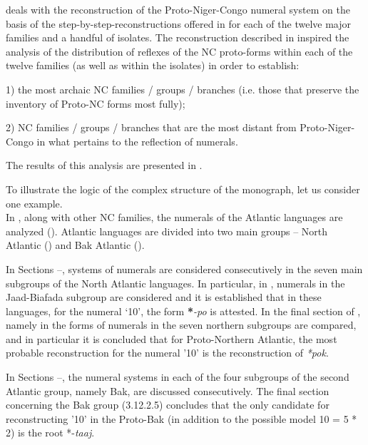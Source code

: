  deals with the reconstruction of the Proto-Niger-Congo numeral system on the basis of the step-by-step-reconstructions offered in  for each of the twelve major families and a handful of isolates.  
The reconstruction described in  inspired the analysis of the distribution of reflexes of the NC proto-forms within each of the twelve families (as well as within the isolates) in order to establish:

1) the most archaic NC families / groups / branches (i.e. those that preserve the inventory of Proto-NC forms most fully); 

2) NC families / groups / branches that are the most distant from Proto-Niger-Congo in what pertains to the reflection of numerals. 

The results of this analysis are presented in .

To illustrate the logic of the complex structure of the monograph, let us consider one example.\\

In , along with other NC families, the numerals of the Atlantic languages are analyzed (). Atlantic languages are divided into two main groups – North Atlantic () and Bak Atlantic ().

In Sections –, systems of numerals are considered consecutively in the seven main subgroups of the North Atlantic languages. In particular, in , numerals in the Jaad-Biafada subgroup are considered and it is established that in these languages, for the numeral ‘10', the form \textbf{*}\textit{{}-po} is attested. In the final section of , namely in  the forms of numerals in the seven northern subgroups are compared, and in particular it is concluded that for Proto-Northern Atlantic, the most probable reconstruction for the numeral '10' is the reconstruction of \textit{*pok}.

In Sections --, the numeral systems in each of the four subgroups of the second Atlantic group, namely Bak, are discussed consecutively. The final section concerning the Bak group (3.12.2.5) concludes that the only candidate for reconstructing '10' in the Proto-Bak (in addition to the possible model 10 = 5 * 2) is the root *-\textit{taaj}.

